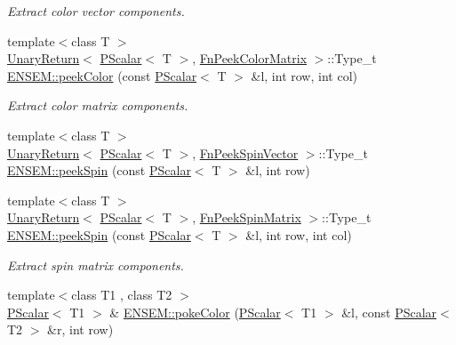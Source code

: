 \begin{DoxyCompactItemize}
\begin{DoxyCompactList}\small\item\em Extract color vector components. \end{DoxyCompactList}\item 
{\footnotesize template$<$class T $>$ }\\\mbox{\hyperlink{structENSEM_1_1UnaryReturn}{Unary\+Return}}$<$ \mbox{\hyperlink{classENSEM_1_1PScalar}{P\+Scalar}}$<$ T $>$, \mbox{\hyperlink{structENSEM_1_1FnPeekColorMatrix}{Fn\+Peek\+Color\+Matrix}} $>$\+::Type\+\_\+t \mbox{\hyperlink{group__primscalar_ga5e0077638719795b3ad6bba20ddb9d4d}{E\+N\+S\+E\+M\+::peek\+Color}} (const \mbox{\hyperlink{classENSEM_1_1PScalar}{P\+Scalar}}$<$ T $>$ \&l, int row, int col)
\begin{DoxyCompactList}\small\item\em Extract color matrix components. \end{DoxyCompactList}\item 
{\footnotesize template$<$class T $>$ }\\\mbox{\hyperlink{structENSEM_1_1UnaryReturn}{Unary\+Return}}$<$ \mbox{\hyperlink{classENSEM_1_1PScalar}{P\+Scalar}}$<$ T $>$, \mbox{\hyperlink{structENSEM_1_1FnPeekSpinVector}{Fn\+Peek\+Spin\+Vector}} $>$\+::Type\+\_\+t \mbox{\hyperlink{group__primscalar_gae58d7282a3d7b7cb78a43c300314fd16}{E\+N\+S\+E\+M\+::peek\+Spin}} (const \mbox{\hyperlink{classENSEM_1_1PScalar}{P\+Scalar}}$<$ T $>$ \&l, int row)
\item 
{\footnotesize template$<$class T $>$ }\\\mbox{\hyperlink{structENSEM_1_1UnaryReturn}{Unary\+Return}}$<$ \mbox{\hyperlink{classENSEM_1_1PScalar}{P\+Scalar}}$<$ T $>$, \mbox{\hyperlink{structENSEM_1_1FnPeekSpinMatrix}{Fn\+Peek\+Spin\+Matrix}} $>$\+::Type\+\_\+t \mbox{\hyperlink{group__primscalar_gae6a011ab6458165e95b6e647d6684b7b}{E\+N\+S\+E\+M\+::peek\+Spin}} (const \mbox{\hyperlink{classENSEM_1_1PScalar}{P\+Scalar}}$<$ T $>$ \&l, int row, int col)
\begin{DoxyCompactList}\small\item\em Extract spin matrix components. \end{DoxyCompactList}\item 
{\footnotesize template$<$class T1 , class T2 $>$ }\\\mbox{\hyperlink{classENSEM_1_1PScalar}{P\+Scalar}}$<$ T1 $>$ \& \mbox{\hyperlink{group__primscalar_ga7e556b2cf2409e6342b4591b4d4fb83f}{E\+N\+S\+E\+M\+::poke\+Color}} (\mbox{\hyperlink{classENSEM_1_1PScalar}{P\+Scalar}}$<$ T1 $>$ \&l, const \mbox{\hyperlink{classENSEM_1_1PScalar}{P\+Scalar}}$<$ T2 $>$ \&r, int row)

\end{DoxyCompactItemize}
